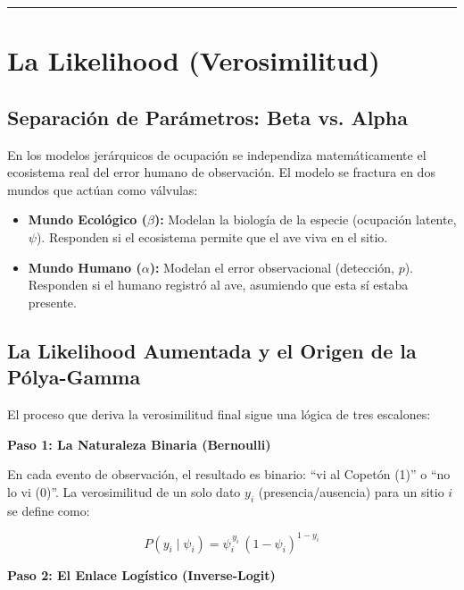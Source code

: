 \documentclass[12pt, a4paper]{article}
\begin{document}
\hrule
\vspace{1em}

\section{La Likelihood (Verosimilitud)}

\subsection{Separación de Parámetros: Beta vs. Alpha}

En los modelos jerárquicos de ocupación se independiza matemáticamente el ecosistema real del error humano de observación. El modelo se fractura en dos mundos que actúan como válvulas:

\begin{itemize}
  \item \textbf{\textcolor{ecogreen}{Mundo Ecológico ($\beta$):}} Modelan la biología de la especie (ocupación latente, $\psi$). Responden si el ecosistema permite que el ave viva en el sitio.
  \item \textbf{\textcolor{humanred}{Mundo Humano ($\alpha$):}} Modelan el error observacional (detección, $p$). Responden si el humano registró al ave, asumiendo que esta sí estaba presente.
\end{itemize}

\subsection{La Likelihood Aumentada y el Origen de la Pólya-Gamma}

El proceso que deriva la verosimilitud final sigue una lógica de tres escalones:

\medskip
\textbf{Paso 1: La Naturaleza Binaria (Bernoulli)}

En cada evento de observación, el resultado es binario: ``vi al Copetón (1)'' o ``no lo vi (0)''. La verosimilitud de un solo dato $y_i$ (presencia/ausencia) para un sitio $i$ se define como:

\begin{equation}
  P(y_i \mid \psi_i) = \psi_i^{\,y_i}\,(1 - \psi_i)^{1-y_i}
\end{equation}

\medskip
\textbf{Paso 2: El Enlace Logístico (Inverse-Logit)}
\end{document}
